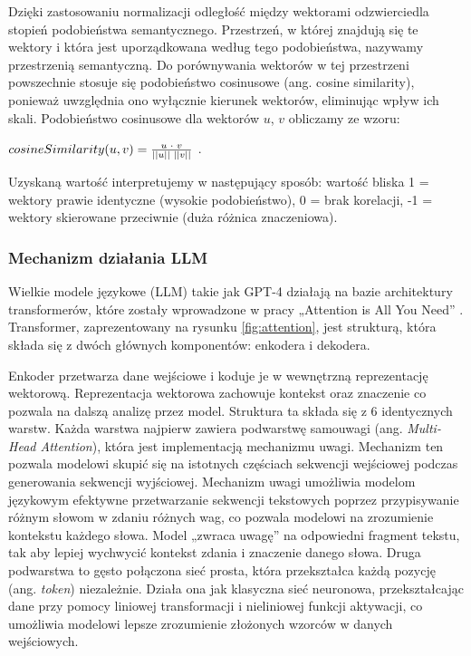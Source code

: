 \documentclass[
a4paper,
12pt,
]{article}
\begin{document}
Dzięki zastosowaniu normalizacji 
odległość między wektorami odzwierciedla stopień podobieństwa semantycznego. Przestrzeń, w której znajdują się te wektory i która jest uporządkowana według tego podobieństwa, nazywamy przestrzenią semantyczną. Do porównywania wektorów w tej przestrzeni powszechnie stosuje się podobieństwo cosinusowe (ang. cosine similarity), ponieważ uwzględnia ono wyłącznie kierunek wektorów, eliminując wpływ ich skali. Podobieństwo cosinusowe dla wektorów $u$, $v$ obliczamy ze wzoru:
\begin{center}
    $cosineSimilarity(u,v) = \frac{u \text{\space} \cdot \text{\space} v}{||u|| \text{\space} ||v||}$ .
\end{center}
Uzyskaną wartość interpretujemy w następujący sposób: wartość bliska 1 = wektory prawie identyczne (wysokie podobieństwo), 0 = brak korelacji, -1 = wektory skierowane przeciwnie (duża różnica znaczeniowa).

\subsubsection{Mechanizm działania LLM}
Wielkie modele językowe (LLM) takie jak GPT-4 działają na bazie architektury transformerów, które zostały wprowadzone w pracy „Attention is All You Need” \cite{attention_2023vaswani}. Transformer, zaprezentowany na rysunku \ref{fig:attention}, jest strukturą, która składa się z dwóch głównych komponentów: enkodera i dekodera. 

Enkoder przetwarza dane wejściowe i koduje je w wewnętrzną reprezentację wektorową. Reprezentacja wektorowa zachowuje kontekst oraz znaczenie co pozwala na dalszą analizę przez model. Struktura ta składa się z 6 identycznych warstw. Każda warstwa najpierw zawiera podwarstwę samouwagi (ang. \textit{Multi-Head Attention}), która jest implementacją mechanizmu uwagi. Mechanizm ten pozwala modelowi skupić się na istotnych częściach sekwencji wejściowej podczas generowania sekwencji wyjściowej. Mechanizm uwagi umożliwia modelom językowym efektywne przetwarzanie sekwencji tekstowych poprzez przypisywanie różnym słowom w zdaniu różnych wag, co pozwala modelowi na zrozumienie kontekstu każdego słowa. Model „zwraca uwagę” na odpowiedni fragment tekstu, tak aby lepiej wychwycić kontekst zdania i znaczenie danego słowa. Druga podwarstwa to gęsto połączona sieć prosta, która przekształca każdą pozycję (ang. \textit{token}) niezależnie. Działa ona jak klasyczna sieć neuronowa, przekształcając dane przy pomocy liniowej transformacji i nieliniowej funkcji aktywacji, co umożliwia modelowi lepsze zrozumienie złożonych wzorców w danych wejściowych.
\end{document}
